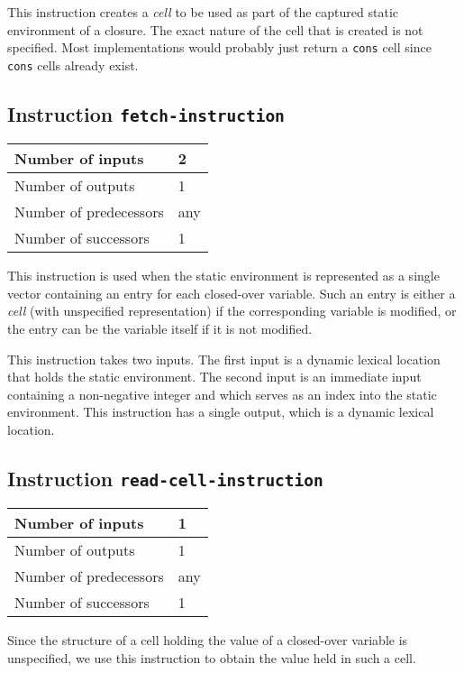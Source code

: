 This instruction creates a \emph{cell} to be used as part of the
captured static environment of a closure.  The exact nature of the
cell that is created is not specified.  Most implementations would
probably just return a \texttt{cons} cell since \texttt{cons} cells
already exist.

\subsection{Instruction \texttt{fetch-instruction}}
\label{hir-instruction-fetch}

\begin{tabular}{|l|l|}
\hline
Number of inputs & 2\\
\hline
Number of outputs & 1\\
\hline
Number of predecessors & any\\
\hline
Number of successors & 1\\
\hline
\end{tabular}

This instruction is used when the static environment is represented as
a single vector containing an entry for each closed-over variable.
Such an entry is either a \emph{cell} (with unspecified
representation) if the corresponding variable is modified, or the
entry can be the variable itself if it is not modified.

This instruction takes two inputs.  The first input is a dynamic
lexical location that holds the static environment.  The second input
is an immediate input containing a non-negative integer and which
serves as an index into the static environment.  This instruction has
a single output, which is a dynamic lexical location.

\subsection{Instruction \texttt{read-cell-instruction}}
\label{hir-instruction-read-cell}

\begin{tabular}{|l|l|}
\hline
Number of inputs & 1\\
\hline
Number of outputs & 1\\
\hline
Number of predecessors & any\\
\hline
Number of successors & 1\\
\hline
\end{tabular}

Since the structure of a cell holding the value of a closed-over
variable is unspecified, we use this instruction to obtain the value
held in such a cell.

